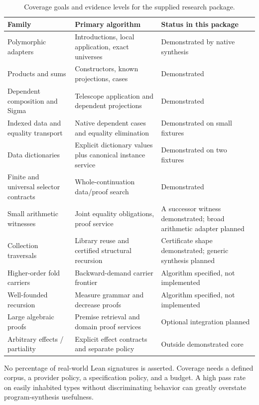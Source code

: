\documentclass[11pt,letterpaper]{article}
\theoremstyle{definition}\newtheorem{definition}[theorem]{Definition}
\theoremstyle{remark}\newtheorem{remark}[theorem]{Remark}
\begin{document}
\begin{table}[htbp]
\centering\small
\begin{tabularx}{\textwidth}{@{}p{}p{}Y@{}}
\toprule Family & Primary algorithm & Status in this package \\
\midrule
Polymorphic adapters & Introductions, local application, exact universes & Demonstrated by native synthesis \\
Products and sums & Constructors, known projections, cases & Demonstrated \\
Dependent composition and Sigma & Telescope application and dependent projections & Demonstrated \\
Indexed data and equality transport & Native dependent cases and equality elimination & Demonstrated on small fixtures \\
Data dictionaries & Explicit dictionary values plus canonical instance service & Demonstrated on two fixtures \\
Finite and universal selector contracts & Whole-continuation data/proof search & Demonstrated \\
Small arithmetic witnesses & Joint equality obligations, proof service & A successor witness demonstrated; broad arithmetic adapter planned \\
Collection traversals & Library reuse and certified structural recursion & Certificate shape demonstrated; generic synthesis planned \\
Higher-order fold carriers & Backward-demand carrier frontier & Algorithm specified, not implemented \\
Well-founded recursion & Measure grammar and decrease proofs & Algorithm specified, not implemented \\
Large algebraic proofs & Premise retrieval and domain proof services & Optional integration planned \\
Arbitrary effects / partiality & Explicit effect contracts and separate policy & Outside demonstrated core \\
\bottomrule
\end{tabularx}
\caption{Coverage goals and evidence levels for the supplied research package.}
\end{table}

No percentage of real-world Lean signatures is asserted. Coverage needs a defined
corpus, a provider policy, a specification policy, and a budget. A high pass rate
on easily inhabited types without discriminating behavior can greatly overstate
program-synthesis usefulness.
\end{document}
